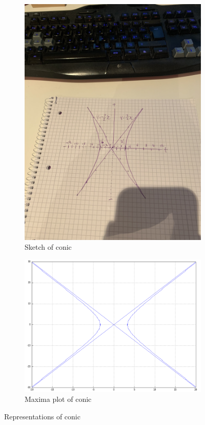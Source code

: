 \documentclass{article}
\begin{document}
\begin{figure}[H]
	\begin{subfigure}{.5\textwidth}
		\centering
		\includegraphics[trim={20cm 10cm 10cm 50cm},clip,width=.7\linewidth]{TMA01-T4-sketch}

		\caption{Sketch of conic}
		\label{fig:conic:sketch}
	\end{subfigure}%
	\begin{subfigure}{.5\textwidth}
		\centering
		\includegraphics[width=.7\linewidth]{TMA01-T4}

		\caption{Maxima plot of conic}
		\label{fig:conic:maxima}
	\end{subfigure}

	\caption{Representations of conic}
	\label{fig:conic}
\end{figure}
\end{document}
